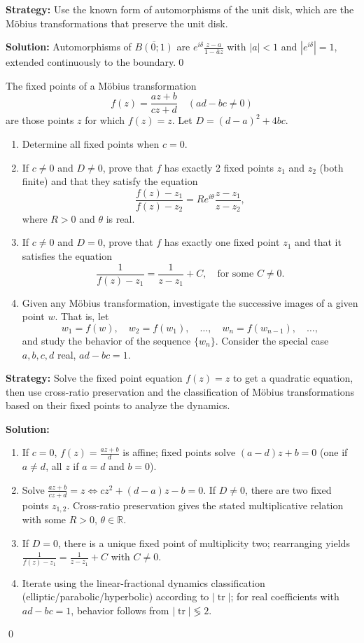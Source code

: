 \noindent\textbf{Strategy:} Use the known form of automorphisms of the unit disk, which are the Möbius transformations that preserve the unit disk.

\bigskip\noindent\textbf{Solution:}
Automorphisms of $\overline{B(0;1)}$ are $e^{i\delta}\frac{z-a}{1-\bar a z}$ with $|a|<1$ and $|e^{i\delta}|=1$, extended continuously to the boundary.\qed


\begin{problembox}
The fixed points of a Möbius transformation
\[ f(z) = \frac{a z + b}{c z + d} \quad (ad - bc \neq 0) \]
are those points \( z \) for which \( f(z) = z \). Let \( D = (d - a)^2 + 4bc \).
\begin{enumerate}[label=(\alph*)]
\item Determine all fixed points when \( c = 0 \).
\item If \( c \neq 0 \) and \( D \neq 0 \), prove that \( f \) has exactly 2 fixed points \( z_1 \) and \( z_2 \) (both finite) and that they satisfy the equation
\[ \frac{f(z) - z_1}{f(z) - z_2} = R e^{i \theta} \frac{z - z_1}{z - z_2}, \]
where \( R > 0 \) and \( \theta \) is real.
\item If \( c \neq 0 \) and \( D = 0 \), prove that \( f \) has exactly one fixed point \( z_1 \) and that it satisfies the equation
\[ \frac{1}{f(z) - z_1} = \frac{1}{z - z_1} + C, \quad \text{for some } C \neq 0. \]
\item Given any Möbius transformation, investigate the successive images of a given point \( w \). That is, let
\[ w_1 = f(w), \quad w_2 = f(w_1), \quad \ldots, \quad w_n = f(w_{n-1}), \quad \ldots, \]
and study the behavior of the sequence \( \{ w_n \} \). Consider the special case \( a, b, c, d \) real, \( ad - bc = 1 \).
\end{enumerate}
\end{problembox}

\noindent\textbf{Strategy:} Solve the fixed point equation \( f(z) = z \) to get a quadratic equation, then use cross-ratio preservation and the classification of Möbius transformations based on their fixed points to analyze the dynamics.

\bigskip\noindent\textbf{Solution:}
\begin{enumerate}[label=(\alph*)]
\item If $c=0$, $f(z)=\frac{a z+b}{d}$ is affine; fixed points solve $(a-d)z+b=0$ (one if $a\ne d$, all $z$ if $a=d$ and $b=0$).
\item Solve $\frac{a z+b}{c z+d}=z\iff c z^2+(d-a)z-b=0$. If $D\ne0$, there are two fixed points $z_{1,2}$. Cross-ratio preservation gives the stated multiplicative relation with some $R>0$, $\theta\in\mathbb R$.
\item If $D=0$, there is a unique fixed point of multiplicity two; rearranging yields $\frac{1}{f(z)-z_1}=\frac{1}{z-z_1}+C$ with $C\ne0$.
\item Iterate using the linear-fractional dynamics classification (elliptic/parabolic/hyperbolic) according to $|\operatorname{tr}|$; for real coefficients with $ad-bc=1$, behavior follows from $|\operatorname{tr}|\lessgtr2$.
\end{enumerate}\qed
